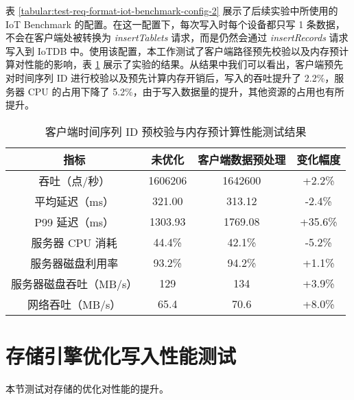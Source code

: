 表 \ref{tabular:test-req-format-iot-benchmark-config-2} 展示了后续实验中所使用的 IoT Benchmark 的配置。在这一配置下，每次写入时每个设备都只写 1 条数据，不会在客户端处被转换为 \emph{insertTablets} 请求，而是仍然会通过 \emph{insertRecords} 请求写入到 IoTDB 中。使用该配置，本工作测试了客户端路径预先校验以及内存预计算对性能的影响，表 \ref{tabular:client-offloading-performance} 展示了实验的结果。从结果中我们可以看出，客户端预先对时间序列 ID 进行校验以及预先计算内存开销后，写入的吞吐提升了 2.2\%，服务器 CPU 的占用下降了 5.2\%，由于写入数据量的提升，其他资源的占用也有所提升。

\begin{table}  
  \centering  
  \caption{客户端时间序列 ID 预校验与内存预计算性能测试结果}  
  \begin{tabular}{cccc}  
    \toprule   
    指标 & 未优化 & 客户端数据预处理 & 变化幅度 \\   
    \midrule  
    吞吐（点/秒） & 1606206 & 1642600 & +2.2\%\\  
    平均延迟（ms） & 321.00 & 313.12 & -2.4\%\\  
    P99 延迟（ms） & 1303.93 & 1769.08 & +35.6\% \\  
    服务器 CPU 消耗 & 44.4\% & 42.1\% & -5.2\%\\  
    服务器磁盘利用率 & 93.2\% & 94.2\% & +1.1\%\\  
    服务器磁盘吞吐（MB/s） & 129 & 134 & +3.9\% \\  
    网络吞吐（MB/s） & 65.4 & 70.6 & +8.0\%\\  
    \bottomrule   
  \end{tabular}  
  \label{tabular:client-offloading-performance}  
\end{table}

\section{存储引擎优化写入性能测试}
本节测试对存储的优化对性能的提升。
